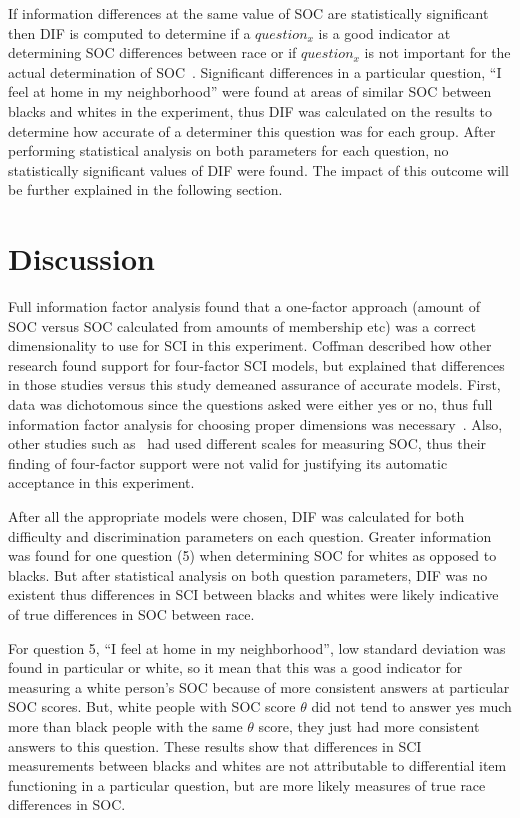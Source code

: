 \documentclass{sig-alternate}
\begin{document}
If information differences at the same value of SOC are statistically significant then DIF is computed to determine if a $question_x$ is a good indicator at determining SOC differences between race or if $question_x$ is not important for the actual determination of SOC~\cite{disparities:2009}.
Significant differences in a particular question, ``I feel at home in my neighborhood'' were found at areas of similar SOC between blacks and whites in the experiment, thus DIF was calculated on the results to determine how accurate of a determiner this question was for each group. After performing statistical analysis on both parameters for each question, no statistically significant values of DIF were found. The impact of this outcome will be further explained in the following section.

\section{Discussion}
\label{sec:discussion}
Full information factor analysis found that a one-factor approach (amount of SOC versus SOC calculated from amounts of membership etc) was a correct dimensionality to use for SCI in this experiment. Coffman described how other research found support for four-factor SCI models, but explained that differences in those studies versus this study demeaned assurance of accurate models. First, data was dichotomous since the questions asked were either yes or no, thus full information factor analysis for choosing proper dimensions was necessary~\cite{disparities:2009}. Also, other studies such as~\cite{validation:2008} had used different scales for measuring SOC, thus their finding of four-factor support were not valid for justifying its automatic acceptance in this experiment. 

After all the appropriate models were chosen, DIF was calculated for both difficulty and discrimination parameters on each question. Greater information was found for one question (5) when determining SOC for whites as opposed to blacks. But after statistical analysis on both question parameters, DIF was no existent thus differences in SCI between blacks and whites were likely indicative of true differences in SOC between race. 

For question 5, ``I feel at home in my neighborhood'', low standard deviation was found in particular or white, so it mean that this was a good indicator for measuring a white person's SOC because of more consistent answers at particular SOC scores. But, white people with SOC score $\theta$ did not tend to answer yes much more than black people with the same $\theta$ score, they just had more consistent answers to this question. These results show that differences in SCI measurements between blacks and whites are not attributable to differential item functioning in a particular question, but are more likely measures of true race differences in SOC. 

\nocite{*}



\end{document}
